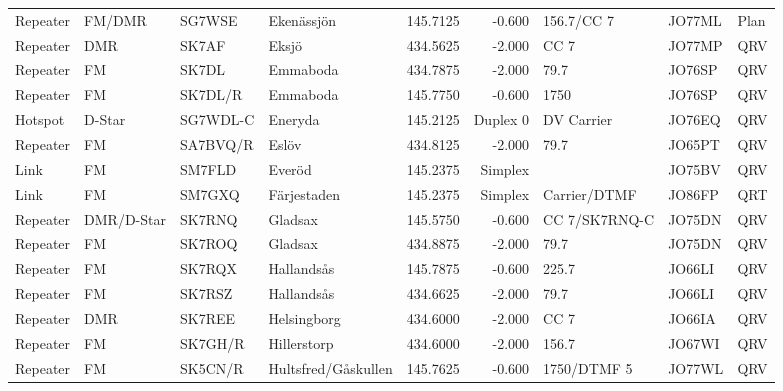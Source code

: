 \begin{landscape}
\begin{longtable}{llllrrlll}
	Repeater & FM/DMR          & SG7WSE   & Ekenässjön           &     145.7125 &     -0.600 & 156.7/CC 7        & JO77ML      & Plan     \\
	Repeater & DMR             & SK7AF    & Eksjö                &     434.5625 &     -2.000 & CC 7              & JO77MP      & QRV      \\
	Repeater & FM              & SK7DL    & Emmaboda             &     434.7875 &     -2.000 & 79.7              & JO76SP      & QRV      \\
	Repeater & FM              & SK7DL/R  & Emmaboda             &     145.7750 &     -0.600 & 1750              & JO76SP      & QRV      \\
	Hotspot  & D-Star          & SG7WDL-C & Eneryda              &     145.2125 &   Duplex 0 & DV Carrier        & JO76EQ      & QRV      \\
	Repeater & FM              & SA7BVQ/R & Eslöv                &     434.8125 &     -2.000 & 79.7              & JO65PT      & QRV      \\
	Link     & FM              & SM7FLD   & Everöd               &     145.2375 &    Simplex &                   & JO75BV      & QRV      \\
	Link     & FM              & SM7GXQ   & Färjestaden          &     145.2375 &    Simplex & Carrier/DTMF      & JO86FP      & QRT      \\
	Repeater & DMR/D-Star      & SK7RNQ   & Gladsax              &     145.5750 &     -0.600 & CC 7/SK7RNQ-C     & JO75DN      & QRV      \\
	Repeater & FM              & SK7ROQ   & Gladsax              &     434.8875 &     -2.000 & 79.7              & JO75DN      & QRV      \\
	Repeater & FM              & SK7RQX   & Hallandsås           &     145.7875 &     -0.600 & 225.7             & JO66LI      & QRV      \\
	Repeater & FM              & SK7RSZ   & Hallandsås           &     434.6625 &     -2.000 & 79.7              & JO66LI      & QRV      \\
	Repeater & DMR             & SK7REE   & Helsingborg          &     434.6000 &     -2.000 & CC 7              & JO66IA      & QRV      \\
	Repeater & FM              & SK7GH/R  & Hillerstorp          &     434.6000 &     -2.000 & 156.7             & JO67WI      & QRV      \\
	Repeater & FM              & SK5CN/R  & Hultsfred/Gåskullen  &     145.7625 &     -0.600 & 1750/DTMF 5       & JO77WL      & QRV      \\

\end{longtable}
\end{landscape}
